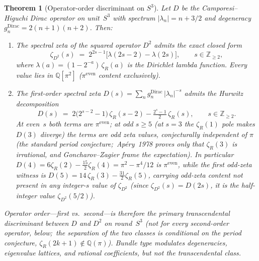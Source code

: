 \documentclass[aps,pra,twocolumn,superscriptaddress,longbibliography]{revtex4-2}
\newtheorem{theorem}{Theorem}
\begin{document}
\begin{theorem}[Operator-order discriminant on $S^3$]
\label{thm:operator_order}
Let $D$ be the Camporesi--Higuchi Dirac operator on unit~$S^3$
with spectrum $|\lambda_n| = n + 3/2$ and degeneracy
$g_n^{\mathrm{Dirac}} = 2(n+1)(n+2)$.  Then:
\begin{enumerate}
\item The spectral zeta of the squared operator $D^2$ admits the
exact closed form
\begin{equation}\label{eq:zeta_d2}
  \zeta_{D^2}(s)
  \;=\; 2^{2s-1}\bigl[\lambda(2s{-}2) - \lambda(2s)\bigr],
  \qquad s \in \mathbb{Z}_{\ge 2},
\end{equation}
where $\lambda(a) = (1 - 2^{-a})\,\zeta_R(a)$ is the Dirichlet lambda
function.  Every value lies in $\mathbb{Q}[\pi^2]$ ($\pi^{\mathrm{even}}$
content exclusively).
\item The first-order spectral zeta $D(s) = \sum_n
g_n^{\mathrm{Dirac}}\,|\lambda_n|^{-s}$ admits the Hurwitz
decomposition
\begin{equation}\label{eq:hurwitz_discriminant}
  D(s) \;=\; 2\bigl(2^{s-2}-1\bigr)\,\zeta_R(s{-}2)
           - \tfrac{2^s - 1}{2}\,\zeta_R(s),
  \qquad s \in \mathbb{Z}_{\ge 2}.
\end{equation}
At even~$s$ both terms are $\pi^{\mathrm{even}}$; at odd $s \ge 5$
(at $s = 3$ the $\zeta_R(1)$ pole makes $D(3)$ diverge) the terms are odd zeta values, conjecturally independent of $\pi$
(the standard period conjecture;\ Ap\'ery~1978 proves only that
$\zeta_R(3)$ is irrational, and Goncharov--Zagier frame the
expectation).  In particular $D(4) = 6\zeta_R(2) - \tfrac{15}{2}\zeta_R(4)
= \pi^2 - \pi^4/12$ is $\pi^{\mathrm{even}}$, while the first odd-zeta
witness is $D(5) = 14\,\zeta_R(3) - \tfrac{31}{2}\zeta_R(5)$, carrying
odd-zeta content not present in any integer-$s$ value of $\zeta_{D^2}$
(since $\zeta_{D^2}(s) = D(2s)$, it is the half-integer value
$\zeta_{D^2}(5/2)$).
\end{enumerate}
Operator order---first vs.\ second---is therefore the primary
transcendental discriminant between $D$ and $D^2$ on round~$S^3$ (not
for every second-order operator, below;\ the separation of the two
classes is conditional on the period conjecture, $\zeta_R(2k{+}1) \notin
\mathbb{Q}(\pi)$).  Bundle type modulates
degeneracies, eigenvalue lattices, and rational coefficients, but
not the transcendental class.
\end{theorem}
\end{document}
